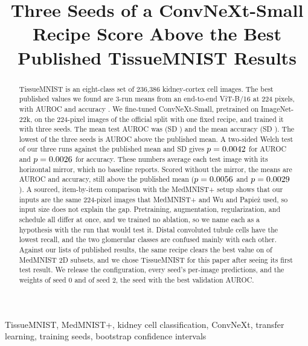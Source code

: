 \documentclass[conference]{IEEEtran}
\begin{document}
\title{Three Seeds of a ConvNeXt-Small Recipe Score Above the Best Published TissueMNIST Results}

\author{
}

\maketitle

\begin{abstract}
TissueMNIST is an eight-class set of 236,386 kidney-cortex cell images. The best
published values we found are 3-run means from an end-to-end ViT-B/16 at 224 pixels, with
AUROC \baseBestAuroc{} and accuracy \baseBestAcc{}. We fine-tuned ConvNeXt-Small,
pretrained on ImageNet-22k, on the 224-pixel images of the official split with one fixed
recipe, and trained it with three seeds. The mean test AUROC was \testAurocMean{} (SD
\testAurocSD{}) and the mean accuracy \testAccMean{} (SD \testAccSD{}). The lowest of the
three seeds is \gainMinSeedAuroc{} AUROC above the published mean. A two-sided Welch test
of our three runs against the published mean and SD gives $p=0.0042{}$ for AUROC
and $p=0.0026{}$ for accuracy. These numbers average each test image with its
horizontal mirror, which no baseline reports. Scored without the mirror, the means are
\testNoFlipAurocMean{} AUROC and \testNoFlipAccMean{} accuracy, still above the published
mean ($p=0.0056{}$ and $p=0.0029{}$). A sourced, item-by-item comparison with the MedMNIST+
setup shows that our inputs are the same 224-pixel images that MedMNIST+ and Wu and
Papie\.{z} used, so input size does not explain the gap. Pretraining, augmentation,
regularization, and schedule all differ at once, and we trained no ablation, so we name each
as a hypothesis with the run that would test it. Distal convoluted tubule cells have the lowest
recall, and the two glomerular classes are confused mainly with each other. Against our lists of published results, the same
recipe clears the best value on \subsetsAbove{} of \subsetsTotal{} MedMNIST 2D
subsets, and we chose TissueMNIST for this paper after seeing its first test result. We
release the configuration, every seed's per-image predictions, and the weights of seed 0 and of seed 2, the seed with the best validation AUROC.
\end{abstract}

\begin{IEEEkeywords}
TissueMNIST, MedMNIST+, kidney cell classification, ConvNeXt, transfer learning,
training seeds, bootstrap confidence intervals
\end{IEEEkeywords}
\end{document}
